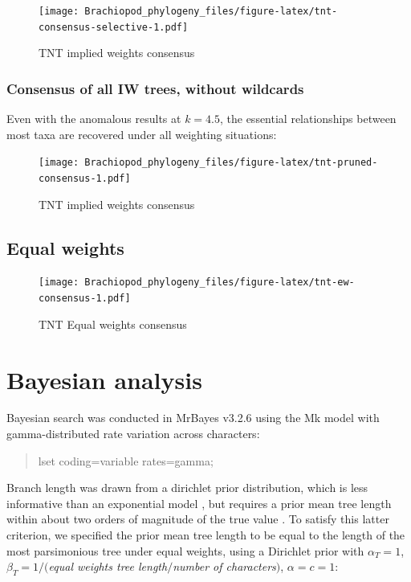 \documentclass[]{book}
\theoremstyle{definition}
\theoremstyle{definition}
\theoremstyle{definition}
\theoremstyle{remark}
\begin{document}
\begin{figure}
\centering
\texttt{[image: Brachiopod\_phylogeny\_files/figure-latex/tnt-consensus-selective-1.pdf]}
\caption{\label{fig:tnt-consensus-selective}TNT implied weights consensus}
\end{figure}

\hypertarget{consensus-of-all-iw-trees-without-wildcards}{%
\subsection{Consensus of all IW trees, without
wildcards}\label{consensus-of-all-iw-trees-without-wildcards}}

Even with the anomalous results at \(k = 4.5\), the essential
relationships between most taxa are recovered under all weighting
situations:

\begin{figure}
\centering
\texttt{[image: Brachiopod\_phylogeny\_files/figure-latex/tnt-pruned-consensus-1.pdf]}
\caption{\label{fig:tnt-pruned-consensus}TNT implied weights consensus}
\end{figure}

\hypertarget{equal-weights}{%
\section{Equal weights}\label{equal-weights}}

\begin{figure}
\centering
\texttt{[image: Brachiopod\_phylogeny\_files/figure-latex/tnt-ew-consensus-1.pdf]}
\caption{\label{fig:tnt-ew-consensus}TNT Equal weights consensus}
\end{figure}

\hypertarget{bayesian}{%
\chapter{Bayesian analysis}\label{bayesian}}

Bayesian search was conducted in MrBayes v3.2.6 \citep{Ronquist2012}
using the Mk model \citep{Lewis2001} with gamma-distributed rate
variation across characters:

\begin{quote}
lset coding=variable rates=gamma;
\end{quote}

Branch length was drawn from a dirichlet prior distribution, which is
less informative than an exponential model \citep{Rannala2012}, but
requires a prior mean tree length within about two orders of magnitude
of the true value \citep{Zhang2012}. To satisfy this latter criterion,
we specified the prior mean tree length to be equal to the length of the
most parsimonious tree under equal weights, using a Dirichlet prior with
\(α_T = 1\), \(β_T = 1/(\)\emph{equal weights tree
length}\(/\)\emph{number of characters}\()\), \(α = c = 1\):
\end{document}
